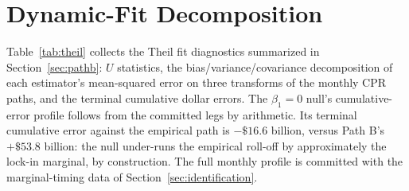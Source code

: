 \documentclass[12pt]{article}
\begin{document}
\section{Dynamic-Fit Decomposition}\label{app:theil}

Table~\ref{tab:theil} collects the Theil fit diagnostics summarized in Section~\ref{sec:pathb}: $U$ statistics, the bias/variance/covariance decomposition of each estimator's mean-squared error on three transforms of the monthly CPR paths, and the terminal cumulative dollar errors. The $\beta_1 = 0$ null's cumulative-error profile follows from the committed legs by arithmetic. Its terminal cumulative error against the empirical path is $-\$16.6$ billion, versus Path B's $+\$53.8$ billion: the null under-runs the empirical roll-off by approximately the lock-in marginal, by construction. The full monthly profile is committed with the marginal-timing data of Section~\ref{sec:identification}.
\end{document}
